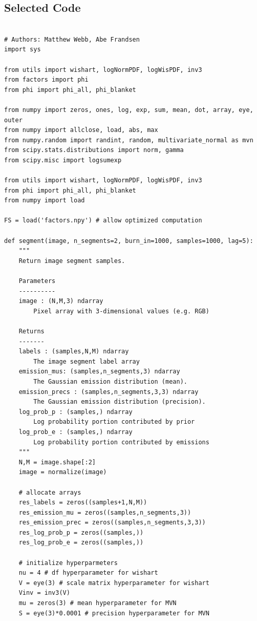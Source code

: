 \documentclass[12pt]{article}
\begin{document}
\subsection{Selected Code}

\begin{verbatim}

# Authors: Matthew Webb, Abe Frandsen
import sys

from utils import wishart, logNormPDF, logWisPDF, inv3
from factors import phi
from phi import phi_all, phi_blanket

from numpy import zeros, ones, log, exp, sum, mean, dot, array, eye, outer
from numpy import allclose, load, abs, max
from numpy.random import randint, random, multivariate_normal as mvn
from scipy.stats.distributions import norm, gamma
from scipy.misc import logsumexp

from utils import wishart, logNormPDF, logWisPDF, inv3
from phi import phi_all, phi_blanket
from numpy import load

FS = load('factors.npy') # allow optimized computation

def segment(image, n_segments=2, burn_in=1000, samples=1000, lag=5):
    """
    Return image segment samples.

    Parameters
    ----------
    image : (N,M,3) ndarray
        Pixel array with 3-dimensional values (e.g. RGB)

    Returns
    -------
    labels : (samples,N,M) ndarray
        The image segment label array
    emission_mus: (samples,n_segments,3) ndarray
        The Gaussian emission distribution (mean).
    emission_precs : (samples,n_segments,3,3) ndarray
        The Gaussian emission distribution (precision).
    log_prob_p : (samples,) ndarray
        Log probability portion contributed by prior
    log_prob_e : (samples,) ndarray
        Log probability portion contributed by emissions
    """
    N,M = image.shape[:2]
    image = normalize(image)   

    # allocate arrays
    res_labels = zeros((samples+1,N,M))
    res_emission_mu = zeros((samples,n_segments,3))
    res_emission_prec = zeros((samples,n_segments,3,3))
    res_log_prob_p = zeros((samples,))
    res_log_prob_e = zeros((samples,))

    # initialize hyperparmeters
    nu = 4 # df hyperparameter for wishart
    V = eye(3) # scale matrix hyperparameter for wishart
    Vinv = inv3(V) 
    mu = zeros(3) # mean hyperparameter for MVN
    S = eye(3)*0.0001 # precision hyperparameter for MVN


\end{verbatim}
\end{document}

